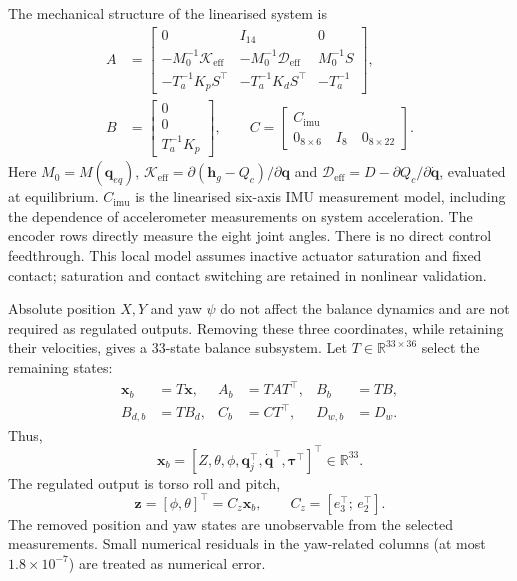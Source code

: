 \documentclass[conference,a4paper]{IEEEtran}
\begin{document}
The mechanical structure of the linearised system is
\begin{equation*}
\begin{aligned}
A&=
\begin{bmatrix}
0&I_{14}&0\\
-M_0^{-1}\mathcal{K}_{\mathrm{eff}}
&-M_0^{-1}\mathcal{D}_{\mathrm{eff}}
&M_0^{-1}S\\
-T_a^{-1}K_pS^\top
&-T_a^{-1}K_dS^\top
&-T_a^{-1}
\end{bmatrix},\\
B&=\begin{bmatrix}0\\0\\T_a^{-1}K_p\end{bmatrix},
\qquad
C=\begin{bmatrix}
C_{\mathrm{imu}}\\
0_{8\times6}\quad I_8\quad 0_{8\times22}
\end{bmatrix}.
\end{aligned}
\end{equation*}
Here $M_0=M(\mathbf{q}_{eq})$, $\mathcal{K}_{\mathrm{eff}}=\partial(\mathbf{h}_g-Q_c)/\partial\mathbf{q}$ and $\mathcal{D}_{\mathrm{eff}}=D-\partial Q_c/\partial\dot{\mathbf{q}}$, evaluated at equilibrium. $C_{\mathrm{imu}}$ is the linearised six-axis IMU measurement model, including the dependence of accelerometer measurements on system acceleration. The encoder rows directly measure the eight joint angles. There is no direct control feedthrough. This local model assumes inactive actuator saturation and fixed contact; saturation and contact switching are retained in nonlinear validation.

Absolute position $X,Y$ and yaw $\psi$ do not affect the balance dynamics and are not required as regulated outputs. Removing these three coordinates, while retaining their velocities, gives a 33-state balance subsystem. Let $T\in\mathbb{R}^{33\times36}$ select the remaining states:
\[
\begin{aligned}
\mathbf{x}_b&=T\mathbf{x},&
A_b&=TAT^\top,& B_b&=TB,\\
B_{d,b}&=TB_d,& C_b&=CT^\top,& D_{w,b}&=D_w.
\end{aligned}
\]
Thus,
\[
\mathbf{x}_b=
[Z,\theta,\phi,\mathbf{q}_j^\top,
\dot{\mathbf{q}}^\top,\boldsymbol{\tau}^\top]^\top
\in\mathbb{R}^{33}.
\]
The regulated output is torso roll and pitch,
\[
\mathbf{z}=[\phi,\theta]^\top=C_z\mathbf{x}_b,
\qquad C_z=[e_3^\top;\,e_2^\top].
\]
The removed position and yaw states are unobservable from the selected measurements. Small numerical residuals in the yaw-related columns (at most $1.8 \times 10^{-7}$) are treated as numerical error.
\end{document}
